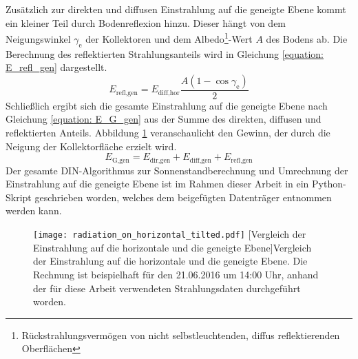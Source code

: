 Zusätzlich zur direkten und diffusen Einstrahlung auf die geneigte Ebene kommt ein kleiner Teil durch Bodenreflexion hinzu. Dieser hängt von dem Neigungswinkel $\gamma_\text{e}$ der Kollektoren und dem Albedo\footnote{Rückstrahlungsvermögen von nicht selbstleuchtenden, diffus reflektierenden Oberflächen}-Wert $A$ des Bodens ab. Die Berechnung des reflektierten Strahlungsanteils wird in Gleichung \ref{equation: E_refl_gen} dargestellt.
\begin{equation}
\label{equation: E_refl_gen}
E_\text{refl,gen} = E_\text{diff,hor} \dfrac{A (1 - \cos \gamma_\text{e})}{2}
\end{equation}
Schließlich ergibt sich die gesamte Einstrahlung  auf die geneigte Ebene nach Gleichung \ref{equation: E_G_gen} aus der Summe des direkten, diffusen und reflektierten Anteils. Abbildung \ref{fig: Vergleich horizontal vs geneigt} veranschaulicht den Gewinn, der durch die Neigung der Kollektorfläche erzielt wird.
\begin{equation}
\label{equation: E_G_gen}
E_\text{G,gen} = E_\text{dir,gen} + E_\text{diff,gen} + E_\text{refl,gen}
\end{equation}
Der gesamte DIN-Algorithmus zur Sonnenstandberechnung und Umrechnung der Einstrahlung auf die geneigte Ebene ist im Rahmen dieser Arbeit in ein Python-Skript geschrieben worden, welches dem beigefügten Datenträger entnommen werden kann.
\begin{figure}[ht]
	\centering
	\texttt{[image: radiation\_on\_horizontal\_tilted.pdf]}
	[Vergleich der Einstrahlung auf die horizontale und die geneigte Ebene]{Vergleich der Einstrahlung auf die horizontale und die geneigte Ebene. Die Rechnung ist beispielhaft für den 21.06.2016 um 14:00 Uhr, anhand der für diese Arbeit verwendeten Strahlungsdaten durchgeführt worden.}
	\label{fig: Vergleich horizontal vs geneigt}
\end{figure}

